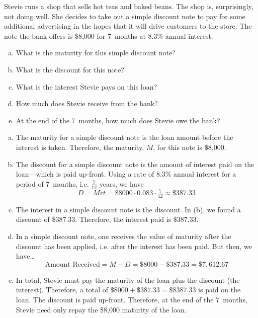 \documentclass[11pt,letterpaper]{article}
\begin{document}
\newpage



 Stevie runs a shop that sells hot teas and baked beans. The shop is, surprisingly, not doing well. She decides to take out a simple discount note to pay for some additional advertising in the hopes that it will drive customers to the store. The note the bank offers is \$8,000 for 7~months at 8.3\% annual interest.
	\begin{enumerate}[(a)]
	\item What is the maturity for this simple discount note?
	\item What is the discount for this note?
	\item What is the interest Stevie pays on this loan?
	\item How much does Stevie receive from the bank?
	\item At the end of the 7~months, how much does Stevie owe the bank?
	\end{enumerate} \pspace

\sol 
\begin{enumerate}[(a)]
\item The maturity for a simple discount note is the loan amount before the interest is taken. Therefore, the maturity, $M$, for this note is \$8,000. \pspace

\item The discount for a simple discount note is the amount of interest paid on the loan---which is paid up-front. Using a rate of 8.3\% annual interest for a period of 7~months, i.e. $\frac{7}{12}$ years, we have
	\[
	D= Mrt= \$8000 \cdot 0.083 \cdot \tfrac{7}{12} \approx \$387.33
	\] \pspace

\item The interest in a simple discount note is the discount. In (b), we found a discount of \$387.33. Therefore, the interest paid is \$387.33. \pspace

\item In a simple discount note, one receives the value of maturity after the discount has been applied, i.e. after the interest has been paid. But then, we have\dots
	\[
	\text{Amount Received}= M - D= \$8000 - \$387.33= \$7,612.67
	\] \pspace

\item In total, Stevie must pay the maturity of the loan plus the discount (the interest). Therefore, a total of $\$8000 + \$387.33= \$8387.33$ is paid on the loan. The discount is paid up-front. Therefore, at the end of the 7~months, Stevie need only repay the \$8,000 maturity of the loan. 
\end{enumerate}
\end{document}
